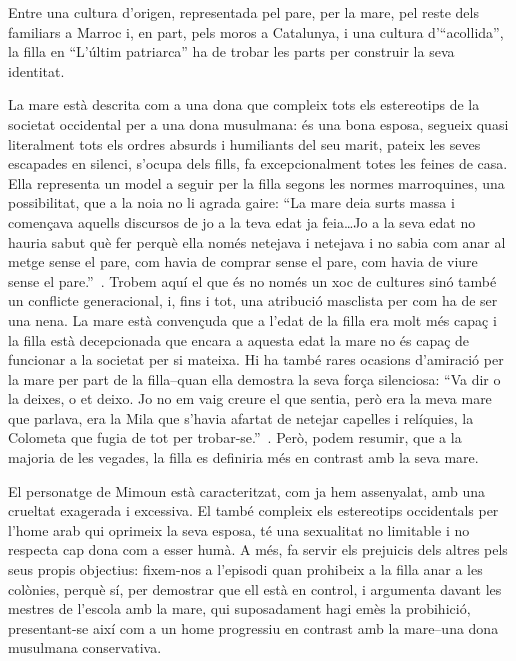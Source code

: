 Entre una cultura d'origen, representada pel pare, per la mare, pel reste dels familiars a Marroc i, en part, pels moros a Catalunya, i una cultura d'``acollida'', la filla en ``L'últim patriarca'' ha de trobar les parts per construir la seva identitat.

La mare està descrita com a una dona que compleix tots els estereotips de la societat occidental per a una dona musulmana:
és una bona esposa, segueix quasi literalment tots els ordres absurds i humiliants del seu marit, pateix les seves escapades en silenci, s'ocupa dels fills, fa excepcionalment totes les feines de casa.
Ella representa un model a seguir per la filla segons les normes marroquines, una possibilitat, que a la noia no li agrada gaire:
``La mare deia surts massa i començava aquells discursos de jo a la teva edat ja feia\ldots Jo a la seva edat no hauria sabut què fer perquè ella només netejava i netejava i no sabia com anar al metge sense el pare, com havia de comprar sense el pare, com havia de viure sense el pare.''~\autocite[188]{ElHachmi2008}.
Trobem aquí el que és no només un xoc de cultures sinó també un conflicte generacional, i, fins i tot, una atribució masclista per com ha de ser una nena.
La mare està convençuda que a l'edat de la filla era molt més capaç i la filla està decepcionada que encara a aquesta edat la mare no és capaç de funcionar a la societat per si mateixa.
Hi ha també rares ocasions d'amiració per la mare per part de la filla--quan ella demostra la seva força silenciosa:
``Va dir o la deixes, o et deixo. Jo no em vaig creure el que sentia, però era la meva mare que parlava, era la Mila que s'havia afartat de netejar capelles i relíquies, la Colometa que fugia de tot per trobar-se.''~\autocite[222]{ElHachmi2008}.
Però, podem resumir, que a la majoria de les vegades, la filla es definiria més en contrast amb la seva mare.

El personatge de Mimoun està caracteritzat, com ja hem assenyalat, amb una crueltat exagerada i excessiva.
El també compleix els estereotips occidentals per l'home arab qui oprimeix la seva esposa, té una sexualitat no limitable i no respecta cap dona com a esser humà.
A més, fa servir els prejuicis dels altres pels seus propis objectius:
fixem-nos a l'episodi quan prohibeix a la filla anar a les colònies, perquè sí, per demostrar que ell està en control, i argumenta davant les mestres de l'escola amb la mare, qui suposadament hagi emès la probihició, presentant-se així com a un home progressiu en contrast amb la mare--una dona musulmana conservativa.

